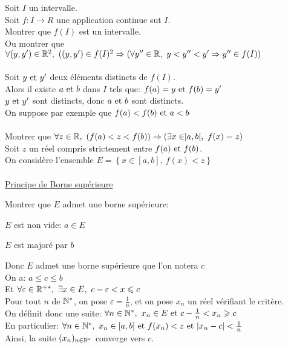 \documentclass[12pt,twoside,a4paper]{article}
\begin{document}
		\begin{preuve}
			Soit $I$ un intervalle.\\
			Soit $f:I\rightarrow R$ une application continue sut $I$.\\
			Montrer que $f(I)$ est un intervalle.\\
			Ou montrer que $\forall (y,y')\in \R^{2},\ ((y,y')\in f(I)^{2}\Rightarrow (\forall y''\in\R,\ y<y''<y'\Rightarrow y''\in f(I))$\\
			\\
			Soit $y\text{ et } y'$ deux éléments distincts de $f(I)$.\\
			Alors il existe $a\text{ et } b$ dans $I$ tels que: $f(a)=y\text{ et } f(b)=y'$\\
			$y\text{ et } y'$ sont distincts, donc $a\text{ et } b$ sont distincts.\\
			On suppose par exemple que $f(a)<f(b)\text{ et } a<b$\\
			\\
			Montrer que $\forall z\in\R,\ \left( f(a)<z<f(b)\right) \Rightarrow \left( \exists x\in ]a,b[,\ f(x)=z\right) $\\
			Soit $z$ un réel compris strictement entre $f(a)\text{ et } f(b)$.\\
			On considère l'ensemble $E= \left\lbrace x\in [a,b],\ f(x)<z\right\rbrace $\\
			\\
			\underline{Principe de Borne supérieure}
			\begin{tab}
				Montrer que $E$ admet une borne supérieure:\begin{liste}
					\item $E$ est non vide: $a\in E$
					\item $E$ est majoré par $b$
				\end{liste}
				Donc $E$ admet une borne supérieure que l'on notera $c$\\
				On a: $a\leqslant c\leqslant b$\\
				Et $\forall \varepsilon \in\mathbb{R}^{+*},\ \exists x\in E,\ c-\varepsilon<x\leqslant c$\\
				Pour tout $n$ de $\mathbb{N}^{*}$, on pose $\varepsilon = \frac1{n}$, et on pose $x_n$ un réel vérifiant le critère.\\
				On définit donc une suite: $\forall n\in\mathbb{N}^{*},\ x_n\in E\text{ et } c-\frac1{n}<x_n\geqslant c$\\
				En particulier: $\forall n\in\N^{*},\ x_n\in[a,b]\et f(x_n)<z\et |x_n-c|<\frac1{n}$\\
				Ainsi, la suite $(x_n)_{n\in\mathbb{N}^{*}}$ converge vers $c$.\\

\end{tab}
\end{preuve}
\end{document}
